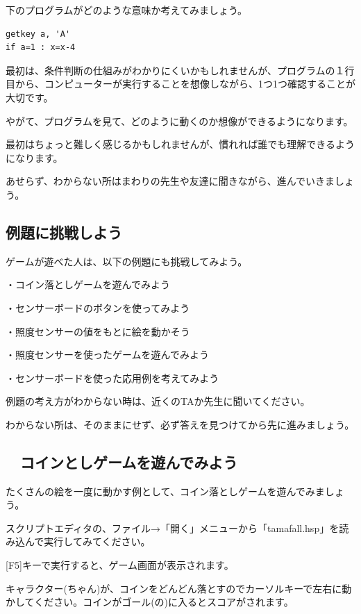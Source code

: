 \documentclass[text04.tex]{subfiles}
\begin{document}
下のプログラムがどのような意味か考えてみましょう。


\begin{lstlisting}[caption=プログラム,numbers=none]
getkey a, 'A'
if a=1 : x=x-4
\end{lstlisting}

最初は、条件判断の仕組みがわかりにくいかもしれませんが、プログラムの１行目から、コンピューターが実行することを想像しながら、1つ1つ確認することが大切です。

やがて、プログラムを見て、どのように動くのか想像ができるようになります。

最初はちょっと難しく感じるかもしれませんが、慣れれば誰でも理解できるようになります。

あせらず、わからない所はまわりの先生や友達に聞きながら、進んでいきましょう。

\subsection{例題に挑戦しよう}

ゲームが遊べた人は、以下の例題にも挑戦してみよう。

・コイン落としゲームを遊んでみよう

・センサーボードのボタンを使ってみよう

・照度センサーの値をもとに絵を動かそう

・照度センサーを使ったゲームを遊んでみよう

・センサーボードを使った応用例を考えてみよう


例題の考え方がわからない時は、近くのTAか先生に聞いてください。

わからない所は、そのままにせず、必ず答えを見つけてから先に進みましょう。

\newpage
\subsection{\useOmetoiExample　コインとしゲームを遊んでみよう}


\exampleinduction

たくさんの絵を一度に動かす例として、コイン落としゲームを遊んでみましょう。

スクリプトエディタの、ファイル→「開く」メニューから「tamafall.hsp」を読み込んで実行してみてください。

[F5]キーで実行すると、ゲーム画面が表示されます。

キャラクター(ちゃん)が、コインをどんどん落とすのでカーソルキーで左右に動かしてください。コインがゴール(の)に入るとスコアがされます。
\end{document}
